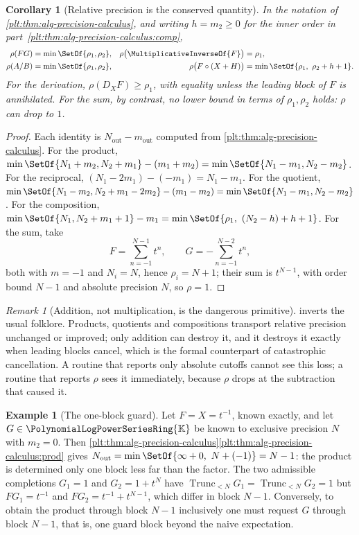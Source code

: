 \documentclass[11pt,oneside]{article}
\theoremstyle{plain}
\newtheorem{corollary}[theorem]{Corollary}
\theoremstyle{definition}
\newtheorem{example}[theorem]{Example}
\theoremstyle{remark}
\newtheorem{remark}[theorem]{Remark}
\newcommand{\K}{\mathbb{K}}
\newcommand{\PLpow}{\PolynomialLogPowerSeriesRing{\K}}   %
\newcommand{\Trunc}[2]{\operatorname{Trunc}_{<#2}#1}     %
\newcommand{\DX}{D_{X}}                                  %
\newcommand{\compose}{\mathbin{\circ}}
\begin{document}
\begin{corollary}[Relative precision is the conserved quantity]
\label{plt:cor:alg-relative-precision}
In the notation of \cref{plt:thm:alg-precision-calculus}, and writing
\(h=m_2\ge0\) for the inner order in
part~\ref{plt:thm:alg-precision-calculus:comp},
\begin{align*}
 \rho(FG)&=\min\SetOf{\rho_1,\rho_2}, &
 \rho\bigl(\MultiplicativeInverseOf{F}\bigr)&=\rho_1, \\
 \rho(A/B)&=\min\SetOf{\rho_1,\rho_2}, &
 \rho\bigl(F\compose(X+H)\bigr)&=\min\SetOf{\rho_1,\ \rho_2+h+1}.
\end{align*}
For the derivation, \(\rho(\DX F)\ge\rho_1\), with equality unless the leading
block of \(F\) is annihilated.  For the sum, by contrast, no lower bound in
terms of \(\rho_1,\rho_2\) holds: \(\rho\) can drop to \(1\).
\end{corollary}

\begin{proof}
Each identity is \(N_{\mathrm{out}}-m_{\mathrm{out}}\) computed from
\cref{plt:thm:alg-precision-calculus}.  For the product,
\(\min\SetOf{N_1+m_2,N_2+m_1}-(m_1+m_2)=\min\SetOf{N_1-m_1,N_2-m_2}\).  For the
reciprocal, \((N_1-2m_1)-(-m_1)=N_1-m_1\).  For the quotient,
\(\min\SetOf{N_1-m_2,N_2+m_1-2m_2}-(m_1-m_2)=\min\SetOf{N_1-m_1,N_2-m_2}\).
For the composition, \(\min\SetOf{N_1,N_2+m_1+1}-m_1
=\min\SetOf{\rho_1,\ (N_2-h)+h+1}\).  For the sum, take
\[
 F=\sum_{n=-1}^{N-1}t^n,
 \qquad
 G=-\sum_{n=-1}^{N-2}t^n,
\]
both with \(m=-1\) and \(N_i=N\), hence \(\rho_i=N+1\); their sum is
\(t^{N-1}\), with order bound \(N-1\) and absolute precision \(N\), so
\(\rho=1\).
\end{proof}

\begin{remark}[Addition, not multiplication, is the dangerous primitive]
\label{plt:rmk:alg-cancellation}
 inverts the usual folklore.  Products,
quotients and compositions transport relative precision unchanged or improved;
only addition can destroy it, and it destroys it exactly when leading blocks
cancel, which is the formal counterpart of catastrophic cancellation.  A
routine that reports only absolute cutoffs cannot see this loss; a routine that
reports \(\rho\) sees it immediately, because \(\rho\) drops at the subtraction
that caused it.
\end{remark}

\begin{example}[The one-block guard]\label{plt:ex:alg-guard-block}
Let \(F=X=t^{-1}\), known exactly, and let \(G\in\PLpow\) be known to exclusive
precision \(N\) with \(m_2=0\).  Then
\cref{plt:thm:alg-precision-calculus}\ref{plt:thm:alg-precision-calculus:prod}
gives \(N_{\mathrm{out}}=\min\SetOf{\infty+0,\ N+(-1)}=N-1\): the product is
determined only one block less far than the factor.  The two admissible
completions \(G_1=1\) and \(G_2=1+t^{N}\) have
\(\Trunc{G_1}{N}=\Trunc{G_2}{N}=1\) but
\(FG_1=t^{-1}\) and \(FG_2=t^{-1}+t^{N-1}\), which differ in block \(N-1\).
Conversely, to obtain the product through block \(N-1\) inclusively one must
request \(G\) through block \(N-1\), that is, one guard block beyond the naive
expectation.
\end{example}
\end{document}
